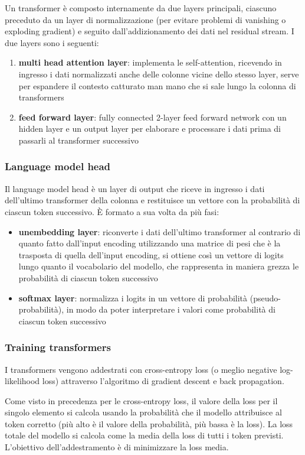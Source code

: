 Un transformer è composto internamente da due layers principali, ciascuno preceduto da un layer di normalizzazione (per
evitare problemi di vanishing o exploding gradient) e seguito dall'addizionamento dei dati nel residual stream. I due layers
sono i seguenti:
\begin{enumerate}
	\item \textbf{multi head attention layer}: implementa le self-attention, ricevendo in ingresso i dati normalizzati anche
	delle colonne vicine dello stesso layer, serve per espandere il contesto catturato man mano che si sale lungo la colonna
	di transformers
	\item \textbf{feed forward layer}: fully connected 2-layer feed forward network con un hidden layer e un output layer per
	elaborare e processare i dati prima di passarli al transformer successivo
\end{enumerate}

\subsubsection*{Language model head}
Il language model head è un layer di output che riceve in ingresso i dati dell'ultimo transformer della colonna e restituisce
un vettore con la probabilità di ciascun token successivo. È formato a sua volta da più fasi:
\begin{itemize}
	\item \textbf{unembedding layer}: riconverte i dati dell'ultimo transformer al contrario di quanto fatto dall'input encoding
	utilizzando una matrice di pesi che è la trasposta di quella dell'input encoding, si ottiene così un vettore di logits lungo
	quanto il vocabolario del modello, che rappresenta in maniera grezza le probabilità di ciascun token successivo
	\item \textbf{softmax layer}: normalizza i logits in un vettore di probabilità (pseudo-probabilità), in modo da poter
	interpretare i valori come probabilità di ciascun token successivo
\end{itemize}

\subsubsection*{Training transformers}
I transformers vengono addestrati con cross-entropy loss (o meglio negative log-likelihood loss) attraverso l'algoritmo di
gradient descent e back propagation.

Come visto in precedenza per le cross-entropy loss, il valore della loss per il singolo elemento si calcola usando la
probabilità che il modello attribuisce al token corretto (più alto è il valore della probabilità, più bassa è la loss).
La loss totale del modello si calcola come la media della loss di tutti i token previsti. L'obiettivo dell'addestramento
è di minimizzare la loss media.

